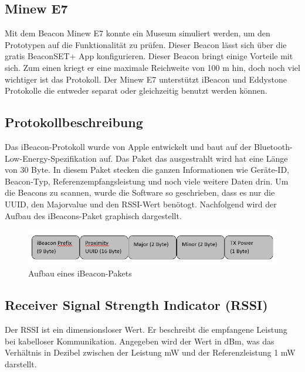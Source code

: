 \subsection*{Minew E7}
Mit dem Beacon Minew E7 konnte ein Museum simuliert werden, um den Prototypen auf die Funktionalität zu prüfen. Dieser Beacon lässt sich über die gratis BeaconSET+ App konfigurieren. Dieser Beacon bringt einige Vorteile mit sich. Zum einen kriegt er eine maximale Reichweite von 100 m  hin, doch noch viel wichtiger ist das Protokoll. Der Minew E7 unterstützt iBeacon und Eddystone Protokolle die entweder separat oder gleichzeitig benutzt werden können. 

\subsection*{Protokollbeschreibung}
Das iBeacon-Protokoll wurde von Apple entwickelt und baut auf der Bluetooth-Low-Energy-Spezifikation auf. Das Paket das ausgestrahlt wird hat eine Länge von 30 Byte. In diesem Paket stecken die ganzen Informationen wie Geräte-ID, Beacon-Typ, Referenzempfangsleistung und noch viele weitere Daten drin. Um die Beacons zu scannen, wurde die Software so geschrieben, dass es nur die UUID, den Majorvalue und den RSSI-Wert benötogt. Nachfolgend wird der Aufbau des iBeacons-Paket graphisch dargestellt. 


\begin{figure}[htp]
	\centering
	\includegraphics[width=15cm]{Bilder/iBeacon_Paket.PNG}
	 \caption{Aufbau eines iBeacon-Pakets}
	 \label{fig:iBeacon}
\end{figure}

\subsection*{Receiver Signal Strength Indicator (RSSI)}
Der RSSI ist ein dimensionsloser Wert. Er beschreibt die empfangene Leistung bei kabelloser Kommunikation. Angegeben wird der Wert in dBm, was das Verhältnis in Dezibel zwischen der Leistung mW und der Referenzleistung 1 mW darstellt. 

